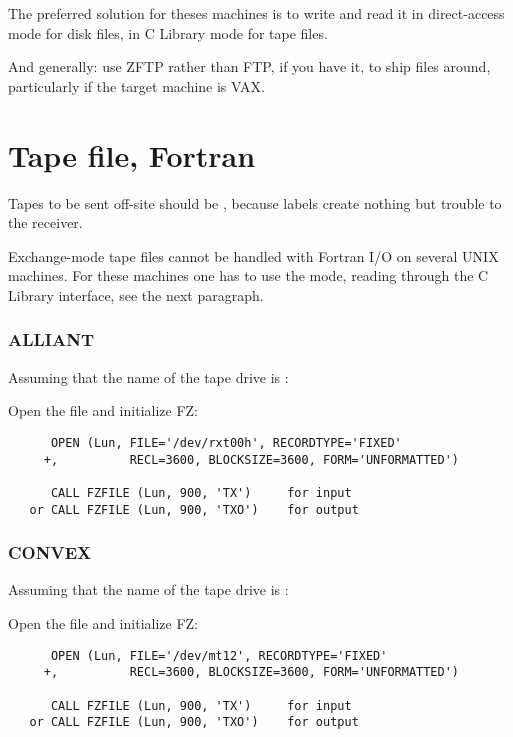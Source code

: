 The preferred solution for theses machines is to write and read it
in direct-access mode for disk files,
in C Library mode for tape files.

And generally: use ZFTP rather than FTP, if you have it,
to ship files around, particularly if the target machine is VAX.

\section{Tape file, Fortran}

Tapes to be sent off-site should be ,
because labels create nothing but trouble to the receiver.

Exchange-mode tape files cannot be handled with Fortran I/O
on several UNIX machines.
For these machines one has to use the  mode,
reading through the C Library interface, see the next paragraph.

\subsubsection*{ALLIANT}

Assuming that the name of the tape drive is :

Open the file and initialize FZ:

\begin{verbatim}
      OPEN (Lun, FILE='/dev/rxt00h', RECORDTYPE='FIXED'
     +,          RECL=3600, BLOCKSIZE=3600, FORM='UNFORMATTED')

      CALL FZFILE (Lun, 900, 'TX')     for input
   or CALL FZFILE (Lun, 900, 'TXO')    for output
\end{verbatim}

\subsubsection{CONVEX}

Assuming that the name of the tape drive is :

Open the file and initialize FZ:

\begin{verbatim}
      OPEN (Lun, FILE='/dev/mt12', RECORDTYPE='FIXED'
     +,          RECL=3600, BLOCKSIZE=3600, FORM='UNFORMATTED')

      CALL FZFILE (Lun, 900, 'TX')     for input
   or CALL FZFILE (Lun, 900, 'TXO')    for output
\end{verbatim}

